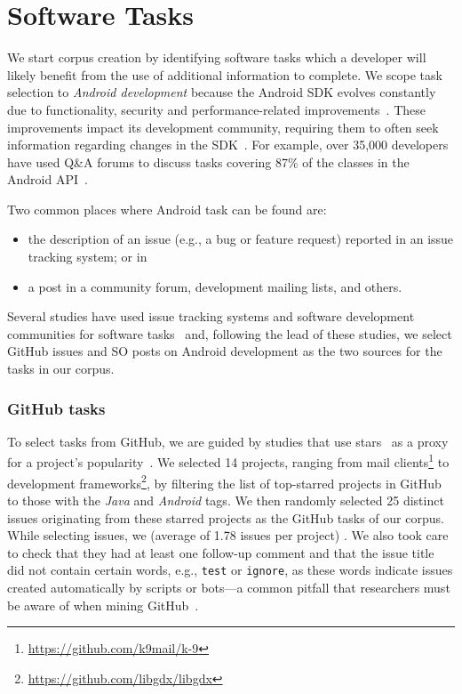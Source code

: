 \section{Software Tasks}
\label{cp4:corpus-tasks}

We start corpus creation by identifying software tasks 
 which a developer will likely benefit from 
the use of additional information to complete.
We scope task selection to \textit{Android development} 
because the 
Android \acf{SDK} evolves constantly due to 
functionality, security and performance-related improvements~\cite{Li2018android, Mateus2020}.
These improvements impact its development community, requiring them to often  seek information regarding changes in the SDK~\cite{linares2014, bavota2014b, mcdonnell2013}.
For example, over 35,000 developers have used Q\&A forums to discuss tasks covering 87\% of the classes in the Android API~\cite{parnin2012}.


Two common places where Android task can be found are:


\begin{itemize}
    \item the description of an issue
    (e.g., a bug or feature request) reported in an issue tracking system; or in
    \item a post in a community forum, development mailing lists, and others.
\end{itemize}

Several studies have used issue tracking systems and software development communities for software tasks~\cite{Arya2019, baltes2019, nadi2020, Xu2017}
and, following the lead
of these studies, we select GitHub issues and \acf{SO} posts on Android development as 
the two sources for the tasks in our corpus.



\subsubsection{GitHub tasks}

To select tasks from GitHub, we are guided by studies that use 
stars~\cite{borges2016, borges2018}
as a proxy for a project's popularity~\cite{Ferreira2016, Xavier2020}.
We selected 14 projects,
ranging from mail clients\footnote{\url{https://github.com/k9mail/k-9}}
to development frameworks\footnote{\url{https://github.com/libgdx/libgdx}},
by filtering the list of top-starred projects in GitHub to those with the \textit{Java} and \textit{Android} tags.
We then randomly selected 25 distinct issues  originating from these starred projects as the GitHub tasks of our corpus.
While selecting issues, we  (average of 1.78 issues per project)
. We also took care to 
check that they had at least one follow-up comment and that the issue title did not contain certain words, e.g., {\small \texttt{test}} or {\small  \texttt{ignore}},
as these words indicate issues  created automatically by scripts or bots---a common pitfall that researchers must be aware of when mining GitHub~\cite{kalliamvakou2014}.


